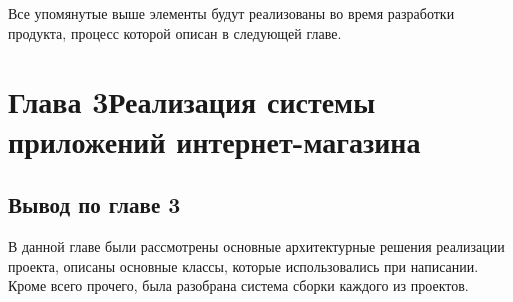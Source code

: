 \documentclass[14pt,a4paper]{scrartcl}
\begin{document}
    Все упомянутые выше элементы будут реализованы во время разработки продукта, процесс которой описан в следующей главе.

    \section[Глава 3 Реализация системы приложений интернет-магазина]{Глава 3\break Реализация системы приложений интернет-магазина}
    \label{sec:charpter-3-inplementation}

    
    
    

    \subsection{Вывод по главе 3}\label{subsec:3-conclusion}\indent

    В данной главе были рассмотрены основные архитектурные решения реализации проекта, описаны основные классы, которые использовались при написании.
    Кроме всего прочего, была разобрана система сборки каждого из проектов.

    
\end{document}
